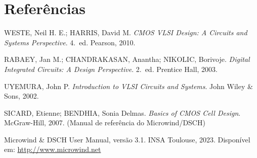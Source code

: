 \documentclass[12pt,a4paper]{article}
\begin{document}
\section*{Referências}

\begin{enumerate}[leftmargin=1.5cm, label={[\arabic*]}]
  \item WESTE, Neil H. E.; HARRIS, David M. \textit{CMOS VLSI Design: A Circuits
        and Systems Perspective}. 4.\ ed. Pearson, 2010.
  \item RABAEY, Jan M.; CHANDRAKASAN, Anantha; NIKOLIC, Borivoje.
        \textit{Digital Integrated Circuits: A Design Perspective}. 2.\ ed.
        Prentice Hall, 2003.
  \item UYEMURA, John P. \textit{Introduction to VLSI Circuits and Systems}.
        John Wiley \& Sons, 2002.
  \item SICARD, Etienne; BENDHIA, Sonia Delmas. \textit{Basics of CMOS Cell Design}.
        McGraw-Hill, 2007. (Manual de referência do Microwind/DSCH)
  \item Microwind \& DSCH User Manual, versão 3.1. INSA Toulouse, 2023.
        Disponível em: \url{http://www.microwind.net}
\end{enumerate}
\end{document}

